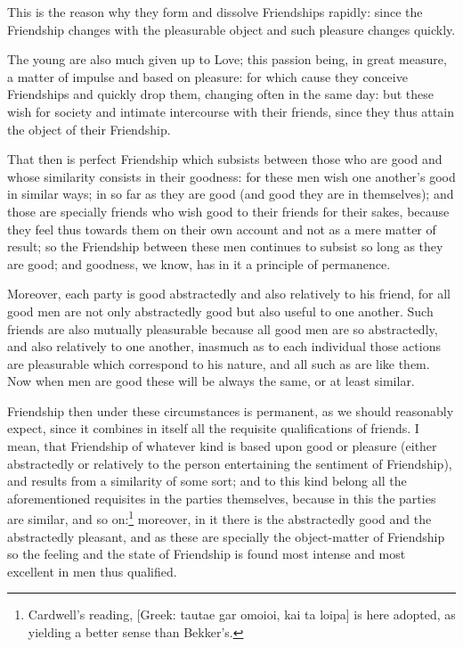 This is the reason why they form and dissolve Friendships rapidly: since the
Friendship changes with the pleasurable object and such pleasure changes
quickly.

The young are also much given up to Love; this passion being, in great measure,
a matter of impulse and based on pleasure: for which cause they conceive
Friendships and quickly drop them, changing often in the same day: but these
wish for society and intimate intercourse with their friends, since they thus
attain the object of their Friendship.


That then is perfect Friendship which subsists between those who are good and
whose similarity consists in their goodness: for these men wish one
another’s good in similar ways; in so far as they are good (and good they
are in themselves); and those are specially friends who wish good to their
friends for their sakes, because they feel thus towards them on their own
account and not as a mere matter of result; so the Friendship between these men
continues to subsist so long as they are good; and goodness, we know, has in it
a principle of permanence.

Moreover, each party is good abstractedly and also relatively to his friend,
for all good men are not only abstractedly good but also useful to one another.
Such friends are also mutually pleasurable because all good men are so
abstractedly, and also relatively to one another, inasmuch as to each
individual those actions are pleasurable which correspond to his nature, and
all such as are like them. Now when men are good these will be always the same,
or at least similar.

Friendship then under these circumstances is permanent, as we should reasonably
expect, since it combines in itself all the requisite qualifications of
friends. I mean, that Friendship of whatever kind is based upon good or
pleasure (either abstractedly or relatively to the person entertaining the
sentiment of Friendship), and results from a similarity of some sort; and to
this kind belong all the aforementioned requisites in the parties themselves,
because in this the parties are similar, and so on:\footnote{Cardwell’s reading, [Greek: tautae gar omoioi, kai ta loipa] is here
adopted, as yielding a better sense than Bekker’s.}
moreover, in it there is the abstractedly good and the abstractedly pleasant,
and as these are specially the object-matter of Friendship so the feeling and
the state of Friendship is found most intense and most excellent in men thus
qualified.

